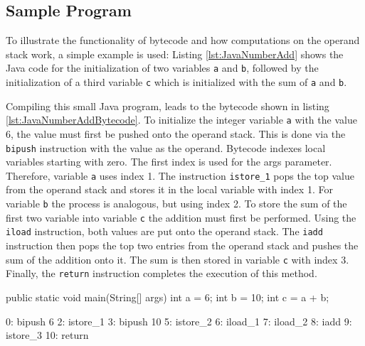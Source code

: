 \subsection{Sample Program}

To illustrate the functionality of bytecode and how computations on the operand stack work, a simple example is used: Listing \ref{lst:JavaNumberAdd} shows the Java code for the initialization of two variables \texttt{a} and \texttt{b},  followed by the initialization of a third variable \texttt{c} which is initialized with the sum of \texttt{a} and \texttt{b}.

Compiling this small Java program, leads to the bytecode shown in listing \ref{lst:JavaNumberAddBytecode}. To initialize the integer variable \texttt{a} with the value 6, the value must first be pushed onto the operand stack. This is done via the \texttt{bipush} instruction with the value as the operand. Bytecode indexes local variables starting with zero. The first index is used for the args parameter. Therefore, variable \texttt{a} uses index 1. The instruction \verb|istore_1| pops the top value from the operand stack and stores it in the local variable with index 1. For variable \texttt{b} the process is analogous, but using index 2. To store the sum of the first two variable into variable \verb|c| the addition must first be performed. Using the \verb|iload| instruction, both values are put onto the operand stack. The \verb|iadd| instruction then pops the top two entries from the operand stack and pushes the sum of the addition onto it. The sum is then stored in variable \verb|c| with index 3. Finally, the \texttt{return} instruction completes the execution of this method.  

\begin{JavaCode}[float,numbers=none,caption=Initialization of two variables and a third one with the sum of the first two variables in Java., label=lst:JavaNumberAdd]
public static void main(String[] args) {
    int a = 6;
    int b = 10;
    int c = a + b;
}
\end{JavaCode}

\begin{Bytecode}[float,numbers=none,caption=Bytecode of the Java program shown in listing \ref{lst:JavaNumberAdd}., label=lst:JavaNumberAddBytecode]
    0: bipush        6
    2: istore_1
    3: bipush        10
    5: istore_2
    6: iload_1
    7: iload_2
    8: iadd
    9: istore_3
   10: return
\end{Bytecode}

